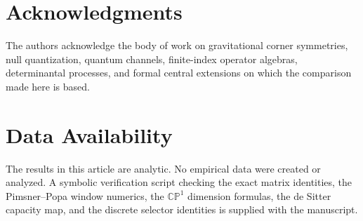 \documentclass[aps,prd,preprint,nofootinbib,superscriptaddress]{revtex4-2}
\theoremstyle{definition}
\theoremstyle{remark}
\newcommand{\CP}{\mathbb{CP}}
\begin{document}
\section*{Acknowledgments}

The authors acknowledge the body of work on gravitational corner symmetries,
null quantization, quantum channels, finite-index operator algebras,
determinantal processes, and formal central extensions on which the comparison
made here is based.

\section*{Data Availability}

The results in this article are analytic.  No empirical data were created or
analyzed.  A symbolic verification script checking the exact matrix
identities, the Pimsner--Popa window numerics, the $\CP^1$ dimension formulas,
the de Sitter capacity map, and the discrete selector identities is supplied
with the manuscript.
\end{document}

